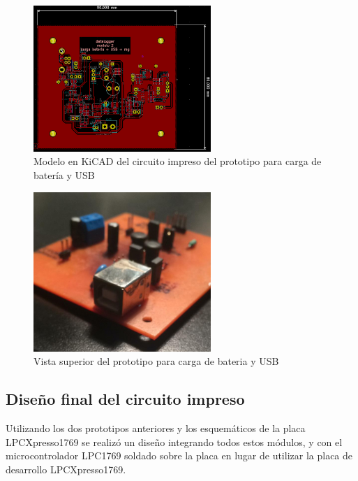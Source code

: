 \begin{figure}[!htbp]
	\centering	
	\includegraphics[width=0.6\textwidth]{./Figures/pcbBateriaInf.png}			
	\caption{Modelo en KiCAD del circuito impreso del prototipo para carga de batería y USB}
	\label{fig:pcbBateriaInf}
\end{figure}

\begin{figure}[!htbp]
	\centering	
	\includegraphics[width=0.6\textwidth]{./Figures/pcbBateriaSup.jpeg}			
	\caption{Vista superior del prototipo para carga de bateria y USB}
	\label{fig:pcbBateriaSup}
\end{figure}


\subsection{Diseño final del circuito impreso} \label{disFinal}

Utilizando los dos prototipos anteriores y los esquemáticos de la placa LPCXpresso1769 \citep{ea2011} se realizó un diseño integrando todos estos módulos, y con el microcontrolador LPC1769 soldado sobre la placa en lugar de utilizar la placa de desarrollo LPCXpresso1769. 

